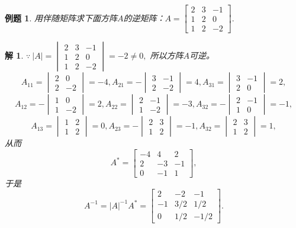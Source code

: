 \documentclass[a4paper]{book}
\newtheorem{eg}{例题}[chapter]
\newtheorem*{solution}{解}
\begin{document}
\begin{eg}
用伴随矩阵求下面方阵$A$的逆矩阵：$A = \begin{bmatrix} 2 & 3 & -1 \\ 1 & 2 & 0 \\ 1 & 2 & -2 \end{bmatrix}.$
\end{eg}

\begin{solution}
$\because \ |A| = \begin{vmatrix} 2 & 3 & -1 \\ 1 & 2 & 0 \\ 1 & 2 & -2 \end{vmatrix} = -2 \neq 0,$ 所以方阵$A$可逆。
$$A_{11} = \begin{vmatrix} 2 & 0 \\ 2 & -2 \end{vmatrix} = -4, A_{21} = -\begin{vmatrix} 3 & -1 \\ 2 & -2 \end{vmatrix} = 4, A_{31} = \begin{vmatrix} 3 & -1 \\ 2 & 0 \end{vmatrix} = 2,$$
$$A_{12} = -\begin{vmatrix} 1 & 0 \\ 1 & -2 \end{vmatrix} = 2, A_{22} = \begin{vmatrix} 2 & -1 \\ 1 & -2 \end{vmatrix} = -3, A_{32} = -\begin{vmatrix} 2 & -1 \\ 1 & 0 \end{vmatrix} = -1,$$
$$A_{13} = \begin{vmatrix} 1 & 2 \\ 1 & 2 \end{vmatrix} = 0, A_{23} = -\begin{vmatrix} 2 & 3 \\ 1 & 2 \end{vmatrix} = -1, A_{32} = \begin{vmatrix} 2 & 3 \\ 1 & 2 \end{vmatrix} = 1,$$
从而
$$A^{\ast} = \begin{bmatrix} -4 & 4 & 2 \\ 2 & -3 & -1 \\ 0 & -1 & 1 \end{bmatrix},$$
于是
$$A^{-1} = |A|^{-1}A^{\ast} = \begin{bmatrix} 2 & -2 & -1 \\ -1 & 3/2 & 1/2 \\ 0 & 1/2 & -1/2 \end{bmatrix}.$$
\end{solution}
\end{document}
